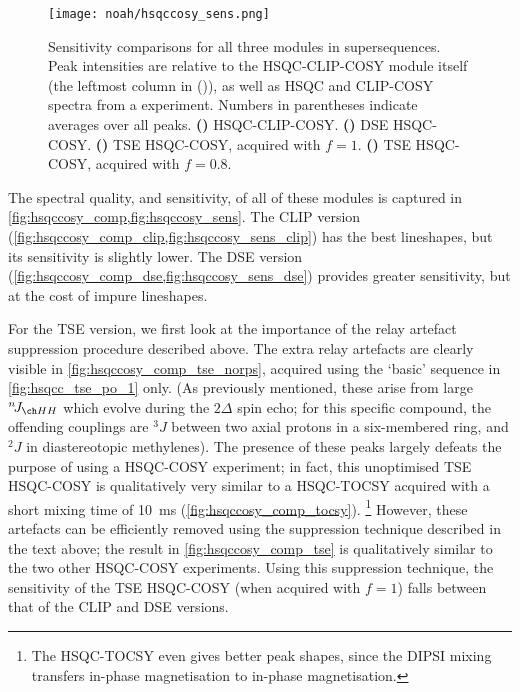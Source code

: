 \begin{figure}[!ht]
    \centering
    \texttt{[image: noah/hsqccosy\_sens.png]}%
    {\label{fig:hsqccosy_sens_clip}}%
    {\label{fig:hsqccosy_sens_dse}}%
    {\label{fig:hsqccosy_sens_tse_1}}%
    {\label{fig:hsqccosy_sens_tse_0p8}}%
    \caption[Sensitivity comparisons for  supersequences]{
        Sensitivity comparisons for all three modules in  supersequences.
        Peak intensities are relative to the HSQC-CLIP-COSY module itself (the leftmost column in ()), as well as HSQC and CLIP-COSY spectra from a  experiment.
        Numbers in parentheses indicate averages over all peaks.
        \textbf{()} HSQC-CLIP-COSY.
        \textbf{()} DSE HSQC-COSY.
        \textbf{()} TSE HSQC-COSY, acquired with $f = 1$.
        \textbf{()} TSE HSQC-COSY, acquired with $f = 0.8$.
    }
    \label{fig:hsqccosy_sens}
\end{figure}

The spectral quality, and sensitivity, of all of these modules is captured in \cref{fig:hsqccosy_comp,fig:hsqccosy_sens}.
The CLIP version (\cref{fig:hsqccosy_comp_clip,fig:hsqccosy_sens_clip}) has the best lineshapes, but its sensitivity is slightly lower.
The DSE version (\cref{fig:hsqccosy_comp_dse,fig:hsqccosy_sens_dse}) provides greater sensitivity, but at the cost of impure lineshapes.

For the TSE version, we first look at the importance of the relay artefact suppression procedure described above.
The extra relay artefacts are clearly visible in \cref{fig:hsqccosy_comp_tse_norps}, acquired using the `basic' sequence in \cref{fig:hsqcc_tse_po_1} only.
(As previously mentioned, these arise from large $\nJ{HH}$ which evolve during the $2\Delta$ spin echo; for this specific compound, the offending couplings are $^3\!J$ between two axial protons in a six-membered ring, and $^2J$ in diastereotopic methylenes).
The presence of these peaks largely defeats the purpose of using a HSQC-COSY experiment; in fact, this unoptimised TSE HSQC-COSY is qualitatively very similar to a HSQC-TOCSY acquired with a short mixing time of \qty{10}{\ms} (\cref{fig:hsqccosy_comp_tocsy}).%
\footnote{The HSQC-TOCSY even gives better peak shapes, since the DIPSI mixing transfers in-phase magnetisation to in-phase magnetisation.}
However, these artefacts can be efficiently removed using the suppression technique described in the text above; the result in \cref{fig:hsqccosy_comp_tse} is qualitatively similar to the two other HSQC-COSY experiments.
Using this suppression technique, the sensitivity of the TSE HSQC-COSY (when acquired with $f = 1$) falls between that of the CLIP and DSE versions.

